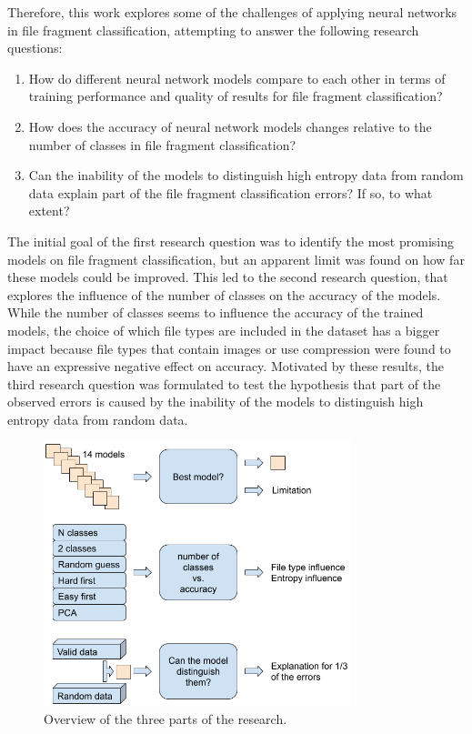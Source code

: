 
Therefore, this work explores some of the challenges of applying neural networks in file fragment classification, attempting to answer the following research questions:

\begin{enumerate}[itemindent=\parindent,label=\textbf{Q\arabic*.}]

    \item How do different neural network models compare to each other in terms of training performance and quality of results for file fragment classification?
    
    \item How does the accuracy of neural network models changes relative to the number of classes in file fragment classification?

    \item Can the inability of the models to distinguish high entropy data from random data explain part of the file fragment classification errors? If so, to what extent?
\end{enumerate}

The initial goal of the first research question was to identify the most promising models on file fragment classification, but an apparent limit was found on how far these models could be improved. This led to the second research question, that explores the influence of the number of classes on the accuracy of the models. While the number of classes seems to influence the accuracy of the trained models, the choice of which file types are included in the dataset has a bigger impact because file types that contain images or use compression were found to have an expressive negative effect on accuracy.
Motivated by these results, the third research question was formulated to test the hypothesis that part of the observed errors is caused by the inability of the models to distinguish high entropy data from random data.

\noindent
\begin{figure}[htb!]
\centering\includegraphics[width=0.8\textwidth]{content/3phases.png}
\caption[Research parts]{\label{fig:steps}Overview of the three parts of the research.}%
\end{figure}


